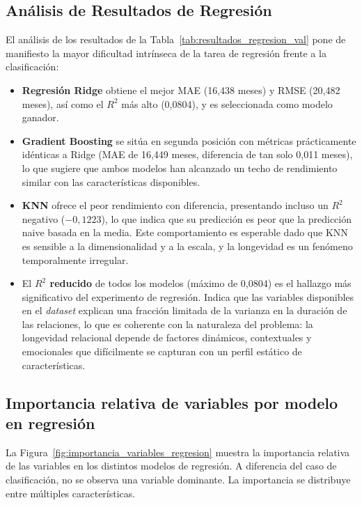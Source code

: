 \subsection{Análisis de Resultados de Regresión}

El análisis de los resultados de la Tabla~\ref{tab:resultados_regresion_val} pone de manifiesto la mayor dificultad intrínseca de la tarea de regresión frente a la clasificación:

\begin{itemize}
    \item \textbf{Regresión Ridge} obtiene el mejor MAE (16,438 meses) y RMSE (20,482 meses), así como el $R^2$ más alto (0,0804), y es seleccionada como modelo ganador.

    \item \textbf{Gradient Boosting} se sitúa en segunda posición con métricas prácticamente idénticas a Ridge (MAE de 16,449 meses, diferencia de tan solo 0,011 meses), lo que sugiere que ambos modelos han alcanzado un techo de rendimiento similar con las características disponibles.

    \item \textbf{KNN} ofrece el peor rendimiento con diferencia, presentando incluso un $R^2$ negativo ($-0,1223$), lo que indica que su predicción es peor que la predicción naive basada en la media. Este comportamiento es esperable dado que KNN es sensible a la dimensionalidad y a la escala, y la longevidad es un fenómeno temporalmente irregular.

    \item El \textbf{$R^2$ reducido} de todos los modelos (máximo de 0,0804) es el hallazgo más significativo del experimento de regresión. Indica que las variables disponibles en el \textit{dataset} explican una fracción limitada de la varianza en la duración de las relaciones, lo que es coherente con la naturaleza del problema: la longevidad relacional depende de factores dinámicos, contextuales y emocionales que difícilmente se capturan con un perfil estático de características.
\end{itemize}

\subsection{Importancia relativa de variables por modelo en regresión}

La Figura~\ref{fig:importancia_variables_regresion} muestra la importancia relativa de las variables en los distintos modelos de regresión. A diferencia del caso de clasificación, no se observa una variable dominante. La importancia se distribuye entre múltiples características.

